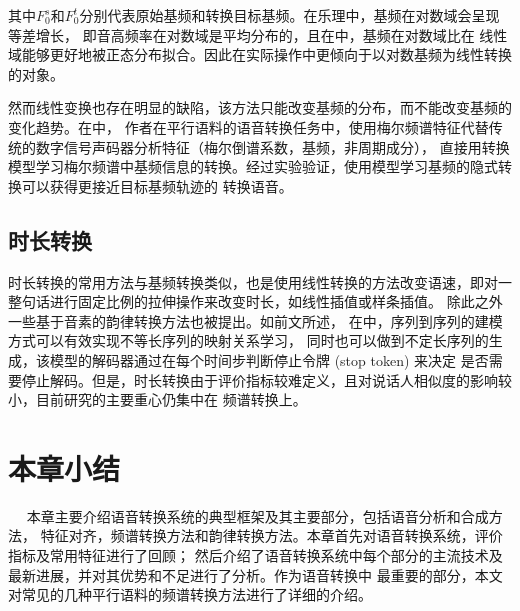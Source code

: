 其中$F_0^s$和$F_0^t$分别代表原始基频和转换目标基频。在乐理中，基频在对数域会呈现等差增长，
即音高频率在对数域是平均分布的，且在\cite{erro2009voice}中，基频在对数域比在
线性域能够更好地被正态分布拟合。因此在实际操作中更倾向于以对数基频为线性转换的对象。

然而线性变换也存在明显的缺陷，该方法只能改变基频的分布，而不能改变基频的变化趋势。在\cite{chen2018high}中，
作者在平行语料的语音转换任务中，使用梅尔频谱特征代替传统的数字信号声码器分析特征（梅尔倒谱系数，基频，非周期成分），
直接用转换模型学习梅尔频谱中基频信息的转换。经过实验验证，使用模型学习基频的隐式转换可以获得更接近目标基频轨迹的
转换语音。

\subsection{时长转换}
时长转换的常用方法与基频转换类似，也是使用线性转换的方法改变语速，即对一整句话进行固定比例的拉伸操作来改变时长，如线性插值或样条插值。
除此之外一些基于音素的韵律转换方法也被提出\cite{helander2007novel}。如前文所述，
在\cite{tanaka2019atts2s}中，序列到序列的建模方式可以有效实现不等长序列的映射关系学习，
同时也可以做到不定长序列的生成，该模型的解码器通过在每个时间步判断停止令牌 (stop token) 来决定
是否需要停止解码。但是，时长转换由于评价指标较难定义，且对说话人相似度的影响较小，目前研究的主要重心仍集中在
频谱转换上。

\section{本章小结}　
本章主要介绍语音转换系统的典型框架及其主要部分，包括语音分析和合成方法，
特征对齐，频谱转换方法和韵律转换方法。本章首先对语音转换系统，评价指标及常用特征进行了回顾；
然后介绍了语音转换系统中每个部分的主流技术及最新进展，并对其优势和不足进行了分析。作为语音转换中
最重要的部分，本文对常见的几种平行语料的频谱转换方法进行了详细的介绍。